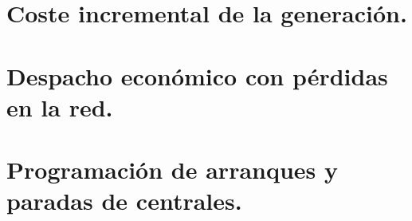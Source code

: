 	\section{Coste incremental de la generación.}
		\subsection{}
	
	\section{Despacho económico con pérdidas en la red.}
		\subsection{}
	
	\section{Programación de arranques y paradas de centrales.}
		\subsection{}
	